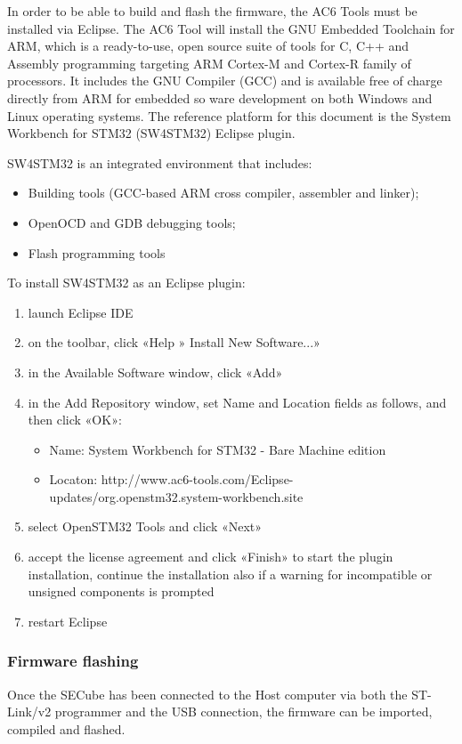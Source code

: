 In order to be able to build and flash the firmware, the AC6 Tools must be installed via Eclipse. The AC6 Tool will install the GNU Embedded Toolchain for ARM, which is a ready-to-use, open
source suite of tools for C, C++ and Assembly programming targeting ARM Cortex-M and Cortex-R
family of processors. It includes the GNU Compiler (GCC) and is available free of charge directly
from ARM for embedded so ware development on both Windows and Linux operating systems.
The reference platform for this document is the System Workbench for STM32 (SW4STM32) Eclipse
plugin.

SW4STM32 is an integrated environment that includes:
\begin{itemize}
	\item Building tools (GCC-based ARM cross compiler, assembler and linker);
	\item OpenOCD and GDB debugging tools;
	\item Flash programming tools
\end{itemize}

To install SW4STM32 as an Eclipse plugin:
\begin{enumerate}
	\item launch Eclipse IDE
	\item on the toolbar, click «Help » Install New Software...»
	\item in the Available Software window, click «Add»
	\item in the Add Repository window, set Name and Location fields as follows, and then click «OK»:
	      \begin{itemize}
		      \item Name: System Workbench for STM32 - Bare Machine edition
		      \item Locaton: http://www.ac6-tools.com/Eclipse-updates/org.openstm32.system-workbench.site
	      \end{itemize}
	\item select OpenSTM32 Tools and click «Next»
	\item accept the license agreement and click «Finish» to start the plugin installation, continue the installation also if a warning for incompatible or unsigned components is prompted
	\item restart Eclipse
\end{enumerate}



\subsubsection{Firmware flashing}
Once the SECube has been connected to the Host computer via both the ST-Link/v2 programmer and the USB connection, the firmware can be imported, compiled and flashed.

